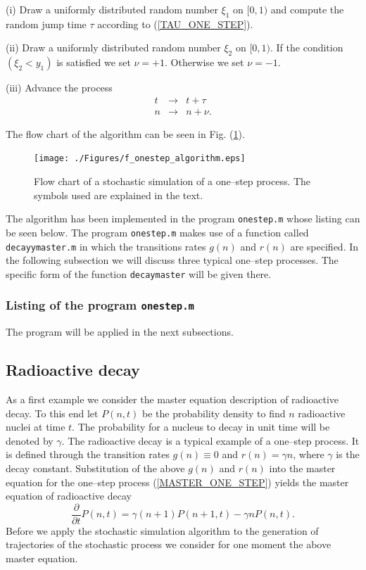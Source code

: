 (i) Draw a uniformly distributed random number $\xi_1$ on $[0,1)$
   and compute the random jump time $\tau$ according to 
   (\ref{TAU_ONE_STEP}). 
   
(ii) Draw a uniformly distributed random number $\xi_2$ on 
$[0,1)$. If the condition $(\xi_2 < y_1)$ is satisfied we set 
$\nu =+1$.  Otherwise we set $\nu =-1$.

(iii) Advance the process
\begin{eqnarray*}
t &\longrightarrow& t+\tau \\
n & \longrightarrow & n + \nu.
\end{eqnarray*}

The flow chart of the algorithm can be seen in Fig. 
(\ref{F_ONESTEP_ALGORITHM}).
\begin{figure}
\label{F_ONESTEP_ALGORITHM}
\texttt{[image: ./Figures/f\_onestep\_algorithm.eps]}
\caption{Flow chart of a stochastic simulation of a 
    one--step process. The symbols used
     are explained in the text.}
\end{figure}
The algorithm has been implemented in the program {\texttt{onestep.m}}
whose listing can be seen below. The program {\texttt{onestep.m}} makes
use of a function called {\texttt{decayymaster.m}} in which the
transitions rates $g(n)$ and $r(n)$ are specified. In the 
following subsection we will discuss three typical one--step 
processes. The specific form of the function \texttt{decaymaster} 
will be given there.

\subsubsection{Listing of the program {\texttt{onestep.m}}}

The program will be applied in the next subsections.


\subsection{Radioactive decay}
As a first example we consider the master equation 
description of radioactive decay. To this end let
$P(n,t)$ be the probability density to find $n$ radioactive nuclei
at time $t$. The probability for a nucleus to decay in unit time will
be denoted by $\gamma$. The radioactive decay is a typical example
of a one--step process. It is defined through
the transition rates
$g(n) \equiv 0$ and $r(n)= \gamma n$, where $\gamma$ is the decay constant.
Substitution of the above $g(n)$ and $r(n)$ into the master equation
for the one--step process
(\ref{MASTER_ONE_STEP}) yields the master equation of radioactive 
decay
\begin{equation}
\frac{\partial}{\partial t} P(n,t) = 
\gamma (n+1) P(n+1,t) - \gamma n P(n,t).
\end{equation}
Before we apply the stochastic simulation algorithm to the 
generation of trajectories of the stochastic process we consider
for one moment the above master equation.

